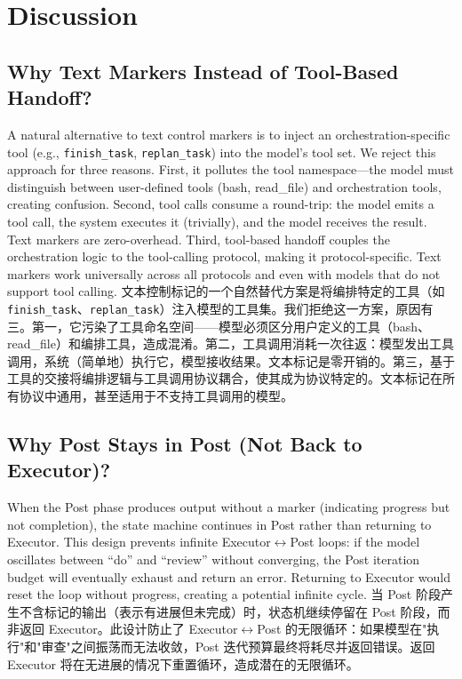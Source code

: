 \section{Discussion}
\label{sec:discussion}

\subsection{Why Text Markers Instead of Tool-Based Handoff?}

A natural alternative to text control markers is to inject an orchestration-specific tool (e.g., \texttt{finish\_task}, \texttt{replan\_task}) into the model's tool set. We reject this approach for three reasons. First, it pollutes the tool namespace---the model must distinguish between user-defined tools (bash, read\_file) and orchestration tools, creating confusion. Second, tool calls consume a round-trip: the model emits a tool call, the system executes it (trivially), and the model receives the result. Text markers are zero-overhead. Third, tool-based handoff couples the orchestration logic to the tool-calling protocol, making it protocol-specific. Text markers work universally across all protocols and even with models that do not support tool calling.
文本控制标记的一个自然替代方案是将编排特定的工具（如 \texttt{finish\_task}、\texttt{replan\_task}）注入模型的工具集。我们拒绝这一方案，原因有三。第一，它污染了工具命名空间——模型必须区分用户定义的工具（bash、read\_file）和编排工具，造成混淆。第二，工具调用消耗一次往返：模型发出工具调用，系统（简单地）执行它，模型接收结果。文本标记是零开销的。第三，基于工具的交接将编排逻辑与工具调用协议耦合，使其成为协议特定的。文本标记在所有协议中通用，甚至适用于不支持工具调用的模型。

\subsection{Why Post Stays in Post (Not Back to Executor)?}

When the Post phase produces output without a marker (indicating progress but not completion), the state machine continues in Post rather than returning to Executor. This design prevents infinite Executor$\leftrightarrow$Post loops: if the model oscillates between ``do'' and ``review'' without converging, the Post iteration budget will eventually exhaust and return an error. Returning to Executor would reset the loop without progress, creating a potential infinite cycle.
当 Post 阶段产生不含标记的输出（表示有进展但未完成）时，状态机继续停留在 Post 阶段，而非返回 Executor。此设计防止了 Executor$\leftrightarrow$Post 的无限循环：如果模型在"执行"和"审查"之间振荡而无法收敛，Post 迭代预算最终将耗尽并返回错误。返回 Executor 将在无进展的情况下重置循环，造成潜在的无限循环。

